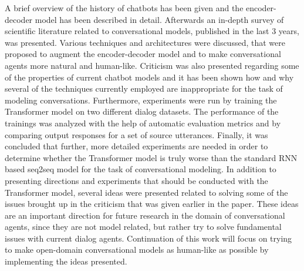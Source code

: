 \documentclass[12pt]{article}
\begin{document}
A brief overview of the history of chatbots has been given and the encoder-decoder model has been described in detail. Afterwards an in-depth survey of scientific literature related to conversational models, published in the last 3 years, was presented. Various techniques and architectures were discussed, that were proposed to augment the encoder-decoder model and to make conversational agents more natural and human-like. Criticism was also presented regarding some of the properties of current chatbot models and it has been shown how and why several of the techniques currently employed are inappropriate for the task of modeling conversations. Furthermore, experiments were run by training the Transformer model on two different dialog datasets. The performance of the trainings was analyzed with the help of automatic evaluation metrics and by comparing output responses for a set of source utterances. Finally, it was concluded that further, more detailed experiments are needed in order to determine whether the Transformer model is truly worse than the standard RNN based seq2seq model for the task of conversational modeling. In addition to presenting directions and experiments that should be conducted with the Transformer model, several ideas were presented related to solving some of the issues brought up in the criticism that was given earlier in the paper. These ideas are an important direction for future research in the domain of conversational agents, since they are not model related, but rather try to solve fundamental issues with current dialog agents. Continuation of this work will focus on trying to make open-domain conversational models as human-like as possible by implementing the ideas presented.



\newpage
\end{document}
